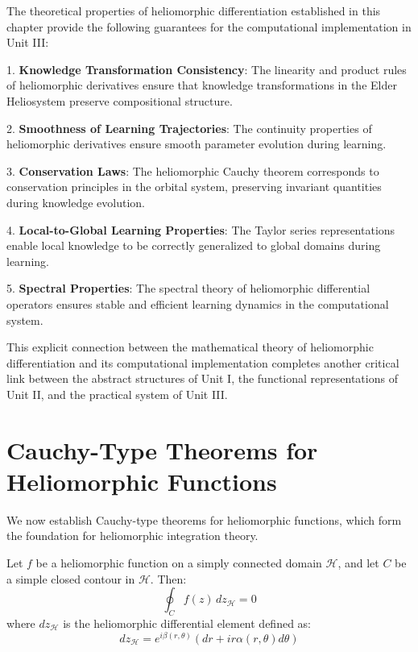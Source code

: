 \begin{corollary}
\label{cor:computational_guarantees_diff}
The theoretical properties of heliomorphic differentiation established in this chapter provide the following guarantees for the computational implementation in Unit III:

1. \textbf{Knowledge Transformation Consistency}: The linearity and product rules of heliomorphic derivatives ensure that knowledge transformations in the Elder Heliosystem preserve compositional structure.

2. \textbf{Smoothness of Learning Trajectories}: The continuity properties of heliomorphic derivatives ensure smooth parameter evolution during learning.

3. \textbf{Conservation Laws}: The heliomorphic Cauchy theorem corresponds to conservation principles in the orbital system, preserving invariant quantities during knowledge evolution.

4. \textbf{Local-to-Global Learning Properties}: The Taylor series representations enable local knowledge to be correctly generalized to global domains during learning.

5. \textbf{Spectral Properties}: The spectral theory of heliomorphic differential operators ensures stable and efficient learning dynamics in the computational system.
\end{corollary}

This explicit connection between the mathematical theory of heliomorphic differentiation and its computational implementation completes another critical link between the abstract structures of Unit I, the functional representations of Unit II, and the practical system of Unit III.

\section{Cauchy-Type Theorems for Heliomorphic Functions}

We now establish Cauchy-type theorems for heliomorphic functions, which form the foundation for heliomorphic integration theory.

\begin{theorem}
Let $f$ be a heliomorphic function on a simply connected domain $\mathcal{H}$, and let $C$ be a simple closed contour in $\mathcal{H}$. Then:
\begin{equation}
\oint_C f(z) \, dz_{\mathcal{H}} = 0
\end{equation}
where $dz_{\mathcal{H}}$ is the heliomorphic differential element defined as:
\begin{equation}
dz_{\mathcal{H}} = e^{i\beta(r,\theta)}(dr + ir\alpha(r,\theta)d\theta)
\end{equation}
\end{theorem}

